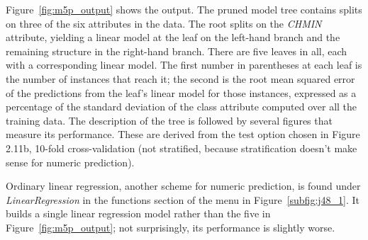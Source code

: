 Figure~\ref{fig:m5p_output} shows the output. The pruned model tree
contains splits on three of the six attributes in the data. The root
splits on the \textit{CHMIN} attribute, yielding a linear model at the
leaf on the left-hand branch and the remaining structure in the
right-hand branch. There are five leaves in all, each with a
corresponding linear model. The first number in parentheses at each
leaf is the number of instances that reach it; the second is the root
mean squared error of the predictions from the leaf's linear model for
those instances, expressed as a percentage of the standard deviation
of the class attribute computed over all the training data. The
description of the tree is followed by several figures that measure
its performance. These are derived from the test option chosen in
Figure 2.11b, 10-fold cross-validation (not stratified, because
stratification doesn’t make sense for numeric prediction).

Ordinary linear regression, another scheme for numeric prediction, is
found under \textit{LinearRegression} in the functions section of the
menu in Figure~\ref{subfig:j48_1}. It builds a single linear
regression model rather than the five in Figure~\ref{fig:m5p_output};
not surprisingly, its performance is slightly worse.

